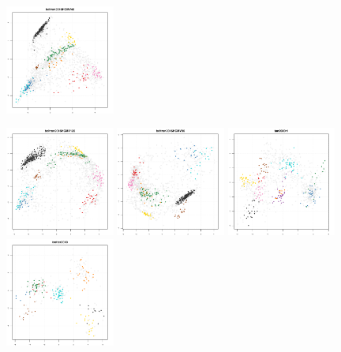 \documentclass[12pt]{article}\usepackage[]{graphicx}\usepackage[]{color}
\begin{document}
\begin{appendices}
\begin{figure}[htb]
  \includegraphics[width = 0.32\textwidth]{./figure/figpca-12.pdf}
\end{figure}
\begin{figure}[htb]\ContinuedFloat
  \includegraphics[width = 0.32\textwidth]{./figure/figpca-13.pdf}
  \includegraphics[width = 0.32\textwidth]{./figure/figpca-14.pdf}
  \includegraphics[width = 0.32\textwidth]{./figure/figpca-15.pdf}
  \includegraphics[width = 0.32\textwidth]{./figure/figpca-16.pdf}

\end{figure}
\end{appendices}
\end{document}
